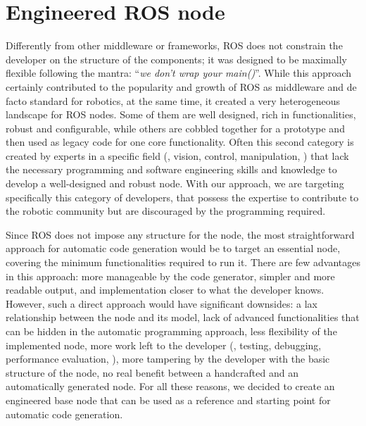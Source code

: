 \section{Engineered ROS node}
\label{sec:ros-node}
Differently from other middleware or frameworks, ROS does not constrain the developer on the structure of the components; it was designed to be maximally flexible following the mantra: ``\textit{we don't wrap your main()}''. While this approach certainly contributed to the popularity and growth of ROS as middleware and de facto standard for robotics, at the same time, it created a very heterogeneous landscape for ROS nodes. Some of them are well designed, rich in functionalities, robust and configurable, while others are cobbled together for a prototype and then used as legacy code for one core functionality. Often this second category is created by experts in a specific field (\eg, vision, control, manipulation, \etc) that lack the necessary programming and software engineering skills and knowledge to develop a well-designed and robust node. With our approach, we are targeting specifically this category of developers, that possess the expertise to contribute to the robotic community but are discouraged by the programming required.

Since ROS does not impose any structure for the node, the most straightforward approach for automatic code generation would be to target an essential node, covering the minimum functionalities required to run it. There are few advantages in this approach: more manageable by the code generator, simpler and more readable output, and implementation closer to what the developer knows. However, such a direct approach would have significant downsides: a lax relationship between the node and its model, lack of advanced functionalities that can be hidden in the automatic programming approach, less flexibility of the implemented node, more work left to the developer (\eg, testing, debugging, performance evaluation, \etc), more tampering by the developer with the basic structure of the node, no real benefit between a handcrafted and an automatically generated node. For all these reasons, we decided to create an engineered base node that can be used as a reference and starting point for automatic code generation.

